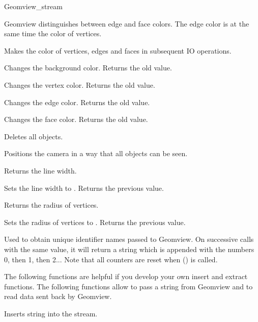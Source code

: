 \begin{ccClass}{Geomview_stream}

Geomview distinguishes between edge and face colors. The edge color
is at the same time the color of vertices. 

{Makes  the color of vertices, edges and faces in subsequent IO 
 operations.}

{Changes the background color. Returns the old value.}

{Changes the vertex color. Returns the old value.}

{Changes the edge color. Returns the old value.}


{Changes the face color. Returns the old value.}



{Deletes all objects.}

{Positions the camera in a way that all objects can be seen.}

{Returns the line width.}

{Sets the line width to . Returns the previous value.}

{Returns the radius of vertices.}

{Sets the radius of vertices to . Returns the previous value.}

{Used to obtain unique identifier names passed to Geomview.  On successive
calls with the same  value, it will return a string which is 
appended with the numbers 0, then 1, then 2...  Note that all counters are
reset when () is called.}



\newpage
\begin{ccAdvanced}


The following functions are helpful if you develop your own insert
and extract functions. The following functions allow to pass a string
from Geomview and to read data sent back by Geomview.

{Inserts string  into the stream.}



\end{ccAdvanced}
\end{ccClass}
